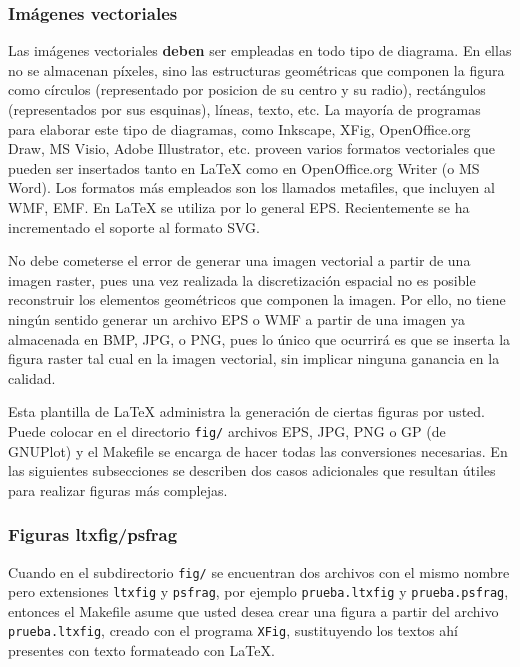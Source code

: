 \subsubsection{Imágenes vectoriales}

Las imágenes vectoriales \textbf{deben} ser empleadas en todo tipo de
diagrama. En ellas no se almacenan píxeles, sino las estructuras geométricas
que componen la figura como círculos (representado por posicion de su centro y
su radio), rectángulos (representados por sus esquinas), líneas, texto, etc. La
mayoría de programas para elaborar este tipo de diagramas, como Inkscape, XFig,
OpenOffice.org Draw, MS Visio, Adobe Illustrator, etc. proveen varios formatos
vectoriales que pueden ser insertados tanto en LaTeX como en OpenOffice.org
Writer (o MS Word). Los formatos más empleados son los llamados metafiles, que
incluyen al WMF, EMF. En LaTeX se utiliza por lo general EPS. Recientemente se
ha incrementado el soporte al formato SVG.

No debe cometerse el error de generar una imagen vectorial a partir de una
imagen raster, pues una vez realizada la discretización espacial no es posible
reconstruir los elementos geométricos que componen la imagen. Por ello, no
tiene ningún sentido generar un archivo EPS o WMF a partir de una imagen ya
almacenada en BMP, JPG, o PNG, pues lo único que ocurrirá es que se inserta la
figura raster tal cual en la imagen vectorial, sin implicar ninguna ganancia en
la calidad.

Esta plantilla de LaTeX administra la generación de ciertas figuras por usted.
Puede colocar en el directorio \texttt{fig/} archivos EPS, JPG, PNG o GP (de
GNUPlot) y el Makefile se encarga de hacer todas las conversiones necesarias.
En las siguientes subsecciones se describen dos casos adicionales que resultan
útiles para realizar figuras más complejas.

\subsubsection{Figuras ltxfig/psfrag}

Cuando en el subdirectorio \texttt{fig/} se encuentran dos archivos con el
mismo nombre pero extensiones \texttt{ltxfig} y \texttt{psfrag}, por ejemplo
\texttt{prueba.ltxfig} y \texttt{prueba.psfrag}, entonces el Makefile asume que
usted desea crear una figura a partir del archivo \texttt{prueba.ltxfig},
creado con el programa \texttt{XFig}, sustituyendo los textos ahí presentes con
texto formateado con LaTeX.

